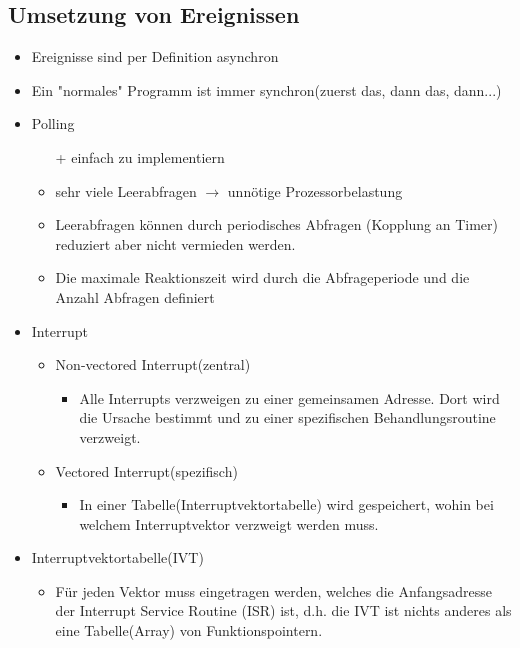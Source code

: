 \subsection{Umsetzung von Ereignissen }
\begin{itemize}
	\item Ereignisse sind per Definition asynchron
	\item Ein "normales" Programm ist immer synchron(zuerst das, dann das, dann...)
	\item Polling
	\begin{itemize}
		\item[+] einfach zu implementiern
		\item sehr viele Leerabfragen $\rightarrow$ unnötige Prozessorbelastung
		\item Leerabfragen können durch periodisches Abfragen (Kopplung an Timer) reduziert aber nicht vermieden werden.
		\item Die maximale Reaktionszeit wird durch die Abfrageperiode und die Anzahl Abfragen definiert
	\end{itemize}
	\item Interrupt
	\begin{itemize}
		\item Non-vectored Interrupt(zentral)
		\begin{itemize}
			\item Alle Interrupts verzweigen zu einer gemeinsamen Adresse. Dort wird die Ursache bestimmt und zu einer spezifischen Behandlungsroutine verzweigt.
		\end{itemize}
		\item Vectored Interrupt(spezifisch)
		\begin{itemize}
			\item In einer Tabelle(Interruptvektortabelle) wird gespeichert, wohin bei welchem Interruptvektor verzweigt werden muss.
		\end{itemize}
	\end{itemize}
	\item	Interruptvektortabelle(IVT)
	\begin{itemize}
		\item Für jeden Vektor muss eingetragen werden, welches die Anfangsadresse der Interrupt Service Routine (ISR) ist, d.h. die IVT ist nichts anderes als eine Tabelle(Array) von Funktionspointern.
	\end{itemize}
\end{itemize}
